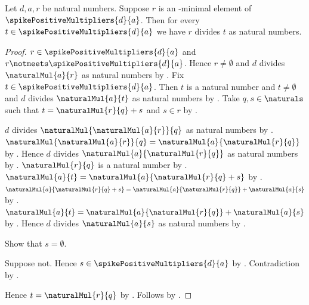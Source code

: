 \begin{theorem}\label{spike15_least_positive_multiplier_divides_all}
    Let $d,a,r$ be natural numbers.
    Suppose $r$ is an \in-minimal element of
        $\spikePositiveMultipliers{d}{a}$.
    Then for every $t\in\spikePositiveMultipliers{d}{a}$ we have
        $r$ divides $t$ as natural numbers.
\end{theorem}
\begin{proof}
    $r\in\spikePositiveMultipliers{d}{a}$ and
        $r\notmeets\spikePositiveMultipliers{d}{a}$.
    Hence $r\neq\emptyset$ and
        $d$ divides $\naturalMul{a}{r}$ as natural numbers
        by .
    Fix $t\in\spikePositiveMultipliers{d}{a}$.
    Then $t$ is a natural number and $t\neq\emptyset$ and
        $d$ divides $\naturalMul{a}{t}$ as natural numbers
        by .
    Take $q,s\in\naturals$ such that
        $t=\naturalMul{r}{q}+s$ and $s\in r$
        by .

    $d$ divides $\naturalMul{\naturalMul{a}{r}}{q}$ as natural numbers
        by .
    $\naturalMul{\naturalMul{a}{r}}{q}
        =\naturalMul{a}{\naturalMul{r}{q}}$
        by .
    Hence $d$ divides $\naturalMul{a}{\naturalMul{r}{q}}$
        as natural numbers by \auto.
    $\naturalMul{r}{q}$ is a natural number
        by .
    $\naturalMul{a}{t}
        =\naturalMul{a}{\naturalMul{r}{q}+s}$ by \auto.
    $\naturalMul{a}{\naturalMul{r}{q}+s}
        =\naturalMul{a}{\naturalMul{r}{q}}+\naturalMul{a}{s}$
        by .
    $\naturalMul{a}{t}
        =\naturalMul{a}{\naturalMul{r}{q}}+\naturalMul{a}{s}$
        by \auto.
    Hence $d$ divides $\naturalMul{a}{s}$ as natural numbers
        by .

    Show that $s=\emptyset$.
    \begin{subproof}
        Suppose not.
        Hence $s\in\spikePositiveMultipliers{d}{a}$
            by .
        Contradiction by .
    \end{subproof}
    Hence $t=\naturalMul{r}{q}$
        by .
    Follows by .
\end{proof}

